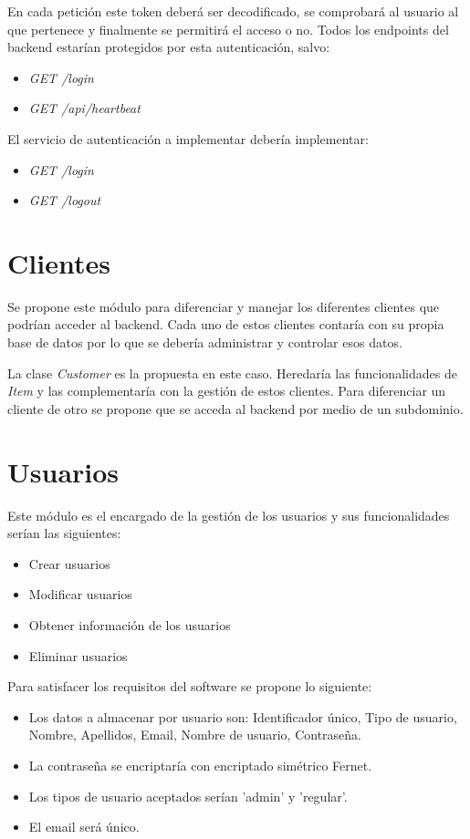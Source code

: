 \bigskip
En cada petición este token deberá ser decodificado, se comprobará al usuario al que pertenece y finalmente se permitirá el acceso o no. Todos los endpoints del backend estarían protegidos por esta autenticación, salvo:
\begin{itemize}
	\item \textit{GET /login}
	\item \textit{GET /api/heartbeat}
\end{itemize}


\bigskip
El servicio de autenticación a implementar debería implementar:
\begin{itemize}
	\item \textit{GET /login}
	\item \textit{GET /logout}
\end{itemize}



\section{Clientes}

Se propone este módulo para diferenciar y manejar los diferentes clientes que podrían acceder al backend. Cada uno de estos clientes contaría con su propia base de datos por lo que se debería administrar y controlar esos datos.

\bigskip
La clase \textit{Customer} es la propuesta en este caso. Heredaría las funcionalidades de \textit{Item} y las complementaría con la gestión de estos clientes. Para diferenciar un cliente de otro se propone que se acceda al backend por medio de un subdominio.



\section{Usuarios}

Este módulo es el encargado de la gestión de los usuarios y sus funcionalidades serían las siguientes:
\begin{itemize}
	\item Crear usuarios
	\item Modificar usuarios
	\item Obtener información de los usuarios
	\item Eliminar usuarios
\end{itemize}


\bigskip
Para satisfacer los requisitos del software se propone lo siguiente:
\begin{itemize}
	\item Los datos a almacenar por usuario son: Identificador único, Tipo de usuario, Nombre, Apellidos, Email, Nombre de usuario, Contraseña.
	\item La contraseña se encriptaría con encriptado simétrico Fernet.
	\item Los tipos de usuario aceptados serían 'admin' y 'regular'.
	\item El email será único.
\end{itemize}



